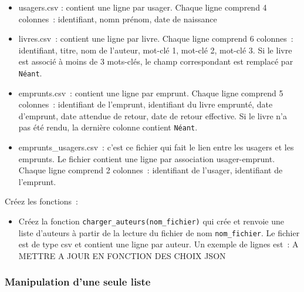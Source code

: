 \documentclass[10pt,a4paper,onecolumn]{article}
\begin{document}
\begin{itemize}
\item usagers.csv : contient une ligne par usager. Chaque ligne comprend 4 colonnes~: identifiant, nomn prénom, date de naissance
\item livres.csv~: contient une ligne par livre. Chaque ligne comprend 6 colonnes~: identifiant, titre, nom de l'auteur, mot-clé 1, mot-clé 2, mot-clé 3. Si le livre est associé à moins de 3 mots-clés, le champ correspondant est remplacé par \texttt{Néant}.
\item emprunts.csv~: contient une ligne par emprunt. Chaque ligne comprend 5 colonnes~: identifiant de l'emprunt, identifiant du livre emprunté, date d'emprunt, date attendue de retour, date de retour effective. Si le livre n'a pas été rendu, la dernière colonne contient \texttt{Néant}. 
\item emprunts_usagers.csv~: c'est ce fichier qui fait le lien entre les usagers et les emprunts. Le fichier contient une ligne par association usager-emprunt. Chaque ligne comprend 2 colonnes~: identifiant de l'usager, identifiant de l'emprunt.
\end{itemize}

Créez les fonctions~:

\begin{itemize}
\item Créez la fonction \texttt{charger\_auteurs(nom\_fichier)} qui crée et renvoie une liste d'auteurs à partir de la lecture du fichier de nom \texttt{nom\_fichier}. Le fichier est de type csv et contient une ligne par auteur. Un exemple de lignes est~: A METTRE A JOUR EN FONCTION DES CHOIX JSON
\end{itemize}



\subsubsection{Manipulation d'une seule liste}
\end{document}
